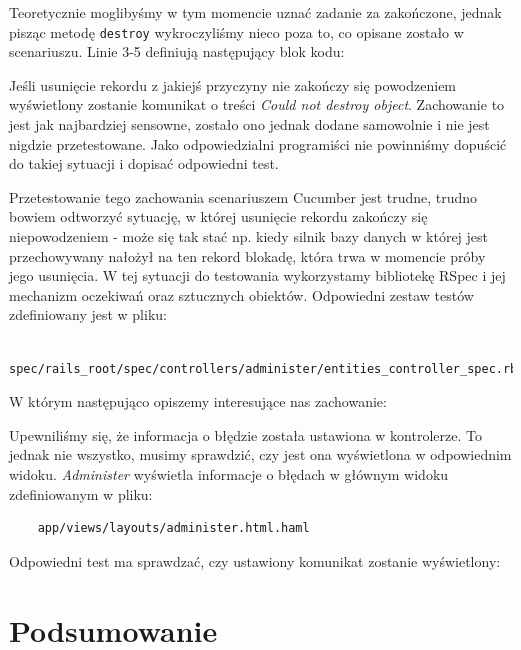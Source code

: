  	Teoretycznie moglibyśmy w tym momencie uznać zadanie za zakończone, jednak pisząc metodę \texttt{destroy} wykroczyliśmy nieco poza to, co opisane zostało w scenariuszu. Linie 3-5 definiują następujący blok kodu:
 	
 	
 	
 	Jeśli usunięcie rekordu z jakiejś przyczyny nie zakończy się powodzeniem wyświetlony zostanie komunikat o treści \emph{Could not destroy object}.
 	Zachowanie to jest jak najbardziej sensowne, zostało ono jednak dodane samowolnie i nie jest nigdzie przetestowane. Jako odpowiedzialni programiści nie powinniśmy dopuścić do takiej sytuacji i dopisać odpowiedni test. 
 	
 	Przetestowanie tego zachowania scenariuszem Cucumber jest trudne, trudno bowiem odtworzyć sytuację, w której usunięcie rekordu zakończy się niepowodzeniem - może się tak stać np. kiedy silnik bazy danych w której jest przechowywany nałożył na ten rekord blokadę, która trwa w momencie próby jego usunięcia. W tej sytuacji do testowania wykorzystamy bibliotekę RSpec i jej mechanizm oczekiwań oraz sztucznych obiektów. Odpowiedni zestaw testów zdefiniowany jest w pliku:
 	
 	\begin{lstlisting}
 	spec/rails_root/spec/controllers/administer/entities_controller_spec.rb
 	\end{lstlisting}
 	
 	W którym następująco opiszemy interesujące nas zachowanie:
 	
 	
 	
 	Upewniliśmy się, że informacja o błędzie została ustawiona w kontrolerze. To jednak nie wszystko, musimy sprawdzić, czy jest ona wyświetlona w odpowiednim widoku. \emph{Administer} wyświetla informacje o błędach w głównym widoku zdefiniowanym w pliku:
 	
 	\begin{lstlisting}
 	app/views/layouts/administer.html.haml
 	\end{lstlisting}
 	
 	Odpowiedni test ma sprawdzać, czy ustawiony komunikat zostanie wyświetlony:
 	
 	
  
  \section{Podsumowanie}
  
